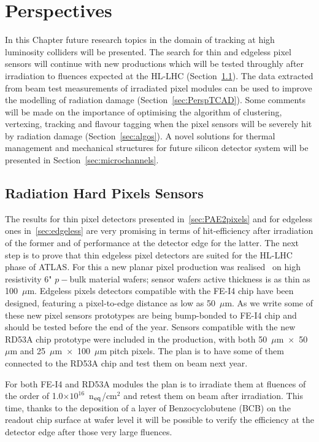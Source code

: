 \chapter{Perspectives}
\label{chap:perspectives}
In this Chapter future research topics in the domain of tracking at high luminosity colliders will be 
presented.
 The search for thin and edgeless pixel sensors will continue with new productions which will 
 be tested throughly after irradiation to fluences expected at the HL-LHC (Section~\ref{sec:PerspPixels}). 
 The data extracted from beam test measurements of irradiated 
 pixel modules can be used to improve the modelling of radiation damage (Section~\ref{sec:PerspTCAD}).
 Some comments will be made on the importance of optimising the 
algorithm of clustering, vertexing, tracking and flavour tagging when the pixel sensors 
will be severely hit by radiation damage (Section~\ref{sec:algos}).
A novel solutions for thermal management and mechanical structures for  future silicon detector system 
will be presented in Section~\ref{sec:microchannels}.



\section{Radiation Hard Pixels Sensors}
\label{sec:PerspPixels}
The results for  thin pixel detectors presented in~\ref{sec:PAE2pixels} and for edgeless 
ones in~\ref{sec:edgeless} are very promising in terms of hit-efficiency after irradiation of the former 
and of performance at the detector edge for the latter. The next step is to prove that 
thin edgeless pixel detectors are suited for the HL-LHC phase of ATLAS. For this a new 
planar pixel production was realised~\cite{SabinaTrentoWS2017} on high resistivity 6" $p-$bulk material 
wafers; sensor wafers active thickness is as thin as 100~$\mu$m. Edgeless pixels detectors 
compatible with the FE-I4 chip  have been designed, featuring a pixel-to-edge distance 
as low as 50~$\mu$m. As we write some of these new pixel sensors prototypes are being bump-bonded 
to FE-I4 chip and should be tested before the end of the year.
Sensors compatible with the new RD53A chip prototype were included in the production, 
with both 50~$\mu$m~$\times$~50~$\mu$m  and 25~$\mu$m~$\times$~100~$\mu$m pitch pixels. 
The plan is to have some of them connected to  the  RD53A chip and test them on beam 
next year.

For both FE-I4 and RD53A modules the plan is to irradiate them at fluences of the order of
 1.0$\times10^{16}$~n$_{\rm eq}$/cm$^2$ and retest them on beam after irradiation. 
This time, thanks to the deposition of   a layer of Benzocyclobutene (BCB) on the readout chip surface at 
wafer level it will be possible to verify the efficiency at the detector edge after those very large fluences. 

